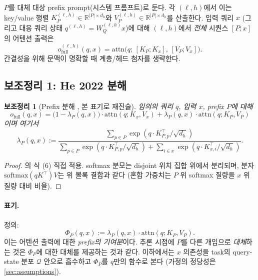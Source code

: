 \documentclass{article}
\newtheorem{lemma}{보조정리}
\theoremstyle{definition}
\newcommand{\R}{\mathbb{R}}
\newcommand{\Phip}{\Phi_P}
\newcommand{\dh}{d_h}
\newcommand{\softmax}{\mathrm{softmax}}
\newcommand{\attn}{\mathrm{attn}}
\begin{document}
$P$를 대체 대상 prefix prompt(시스템 프롬프트)로 둔다. 각 $(\ell, h)$에서 이는 key/value 행렬 $K_P^{(\ell,h)} \in \R^{|P|\times \dh}$와 $V_P^{(\ell,h)} \in \R^{|P|\times \dh}$를 산출한다. 입력 쿼리 $x$ (그리고 대응 쿼리 상태 $q^{(\ell,h)} = W_Q^{(\ell,h)} x$)에 대해 $(\ell, h)$에서 \emph{전체} 시퀀스 $[P; x]$의 어텐션 출력은
\begin{equation}
o_{\mathrm{full}}^{(\ell,h)}(q,x) = \attn\bigl(q;\, [K_P; K_x],\, [V_P; V_x]\bigr).
\end{equation}
간결성을 위해 문맥이 명확할 때 계층/헤드 첨자를 생략한다.

\subsection{보조정리 1: He 2022 분해}
\label{sec:lemma1}

\begin{lemma}[Prefix 분해 \citep{he2022unified}, 본 표기로 재진술]
\label{lem:he}
임의의 쿼리 $q$, 입력 $x$, prefix $P$에 대해
\begin{equation}
o_{\mathrm{full}}(q,x) = \bigl(1-\lambda_P(q,x)\bigr)\cdot \attn(q; K_x, V_x) + \lambda_P(q,x)\cdot \attn(q; K_P, V_P)
\label{eq:he-decomp}
\end{equation}
이며 여기서
\begin{equation}
\lambda_P(q,x) := \frac{\sum_{p\in P} \exp(q \cdot K_{P,p}^\top / \sqrt{\dh})}{\sum_{p\in P}\exp(q\cdot K_{P,p}^\top/\sqrt{\dh}) + \sum_{i\in x}\exp(q\cdot K_{x,i}^\top/\sqrt{\dh})}.
\end{equation}
\end{lemma}

\begin{proof}
\citet{he2022unified}의 식 (6) 직접 적용. softmax 분모는 disjoint 위치 집합 위에서 분리되며, 분자 $\softmax(qK^\top)V$는 위 볼록 결합과 같다 (혼합 가중치는 $P$ 위 softmax 질량을 $x$ 위 질량 대비 비율).
\end{proof}

\paragraph{표기.} 정의:
\begin{equation}
\Phip(q,x) := \lambda_P(q,x)\cdot \attn(q; K_P, V_P).
\end{equation}
이는 어텐션 출력에 대한 \emph{prefix의 기여분}이다. 추론 시점에 $P$를 다른 개입으로 \emph{대체}하는 것은 $\Phip$에 대한 대체를 제공하는 것과 같다. 이하에서는 $x$ 의존성을 task의 query-state 분포 $\mathcal{Q}$ 안으로 흡수하고 $\Phip$를 $q$만의 함수로 본다 (가정의 정당성은 \cref{sec:assumptions}).
\end{document}
